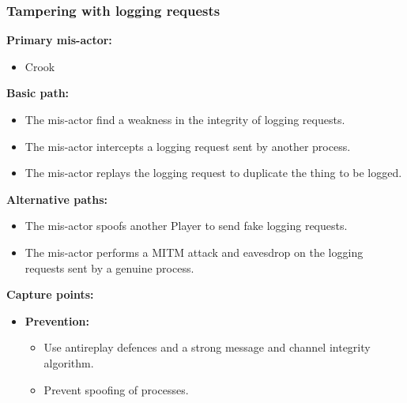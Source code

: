 \documentclass[a4paper,11pt]{report}
\begin{document}
\subsubsection{Tampering with logging requests}
\label{LoggingEngineFlowCasesT}
\textbf{Primary mis-actor:}
\begin{itemize}
\item Crook
\end{itemize}
\textbf{Basic path:}
\begin{itemize}
\item The mis-actor find a weakness in the integrity of logging requests.
\item The mis-actor intercepts a logging request sent by another process.
\item The mis-actor replays the logging request to duplicate the thing to be logged.
\end{itemize}
\textbf{Alternative paths:}
\begin{itemize}
\item The mis-actor spoofs another Player to send fake logging requests.
\item The mis-actor performs a MITM attack and eavesdrop on the logging requests sent by a genuine process.
\end{itemize}
\textbf{Capture points:}
\begin{itemize}
\item \textbf{Prevention:}
\begin{itemize}
\item Use antireplay defences and a strong message and channel integrity algorithm.
\item Prevent spoofing of processes.
\end{itemize}
\end{itemize}
\end{document}
